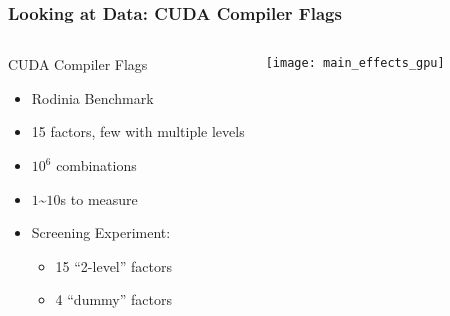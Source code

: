 \documentclass[10pt, compress, aspectratio=169, xcolor={table,usenames,dvipsnames}]{beamer}
\begin{document}
\begin{frame}
    \frametitle{Looking at Data: CUDA Compiler Flags}
    \begin{columns}[c]
            \begin{block}{CUDA Compiler Flags}
                \begin{itemize}
                    \item \alert{Rodinia Benchmark}
                    \item \alert{15} factors, \alert{few with
                        multiple levels}
                    \item \alert{$10^6$} combinations
                    \item \alert{$1$\textasciitilde$10$s} to measure
                    \item \alert{Screening Experiment}:
                        \begin{itemize}
                            \item \alert{15 ``2-level''} factors
                            \item \alert{4 ``dummy''} factors
                        \end{itemize}
                \end{itemize}
            \end{block}

            \begin{block}{}
                \vspace{-.4cm}
                \texttt{[image: main\_effects\_gpu]}
            \end{block}

    \end{columns}
\end{frame}
\end{document}
